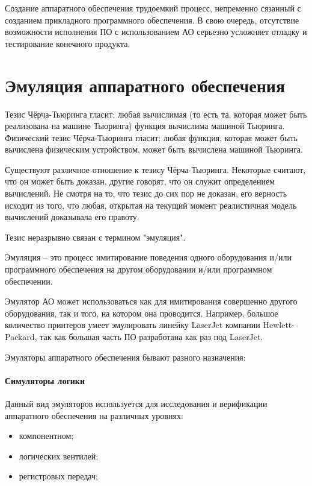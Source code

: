 Создание аппаратного обеспечения трудоемкий процесс, непременно сязанный с созданием прикладного программного обеспечения.
В свою очередь, отсутствие возможности исполнения ПО с использованием АО серьезно усложняет отладку и тестирование конечного продукта.

\section{Эмуляция аппаратного обеспечения}\label{sec:ch1/sec1}

Тезис Чёрча-Тьюринга гласит: любая вычислимая (то есть та,
которая может быть реализована на машине Тьюринга) функция вычислима машиной Тьюринга.
Физический тезис Чёрча-Тьюринга гласит: любая функция, которая может быть вычислена физическим устройством, может быть вычислена машиной Тьюринга.

Существуют различное отношение к тезису Чёрча-Тьюринга.
Некоторые считают, что он может быть доказан, другие говорят, что он служит определением вычислений.
Не смотря на то, что тезис до сих пор не доказан, его верность исходит из того, что любая, открытая на текущий момент
реалистичная модель вычислений доказывала его правоту.

Тезис неразрывно связан с термином "эмуляция".

Эмуляция -- это процесс имитирование поведения одного оборудования и/или программного обеспечения
на другом оборудовании и/или программном обеспечении.

Эмулятор АО может использоваться как для имитирования совершенно другого оборудования, так и того, на котором она проводится.
Например, большое количество принтеров умеет эмулировать линейку LaserJet компании Hewlett-Packard,
так как большая часть ПО разработана как раз под LaserJet.

Эмуляторы аппаратного обеспечения бывают разного назначения:

\paragraph{Симуляторы логики}\label{logic-sim}

Данный вид эмуляторов используется для исследования и верификации аппаратного обеспечения на различных уровнях:
\begin{itemize}
    \item компонентном;
    \item логических вентилей;
    \item регистровых передач;
\end{itemize}

